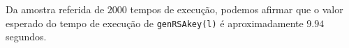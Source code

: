 \documentclass[dvipsnames]{article}
\begin{document}
\begin{multicols}{2}
  \vskip 0.2cm
  
  \noindent {}
  
  Da amostra referida de $2000$ tempos de execução, podemos afirmar que o valor esperado do tempo de execução de \texttt{genRSAkey(l)} é aproximadamente $9.94$ segundos.

  
  
  
\end{multicols}
\end{document}
